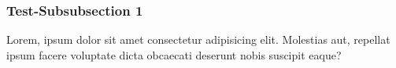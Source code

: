 \subsubsection{Test-Subsubsection 1} \label{subsubsec:testSubsubsection1}
    Lorem, ipsum dolor sit amet consectetur adipisicing elit. Molestias aut, repellat ipsum facere voluptate dicta obcaecati deserunt nobis suscipit eaque?